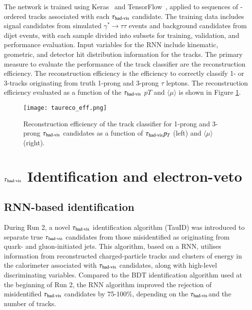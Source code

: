         The network is trained using Keras~\cite{chollet2015keras} and TensorFlow~\cite{tensorflow2015-whitepaper}, 
        applied to sequences of \pt-ordered tracks associated with 
        each $\tau_{\text{had-vis}}$ candidate. The training data includes signal candidates from simulated \(\gamma^* \rightarrow \tau\tau\) 
        events and background candidates from dijet events, with each sample divided into subsets for training, validation, and performance evaluation. 
        Input variables for the RNN include kinematic, geometric, and detector hit distribution information for the tracks. 
        The primary measure to evaluate the performance of the track classifier are the reconstruction efficiency.
        The reconstruction efficiency is the efficiency to correctly classify 1- or 3-tracks originating from truth 1-prong and 3-prong \(\tau\) leptons.
        The reconstruction efficiency evaluated as a function of the $\tau_{\text{had-vis}}$ $pT$ and $\langle \mu \rangle$ is shown in Figure \ref{fig:track_classification_eff}.
        \begin{figure}[htbp]
            \centering
            \texttt{[image: taureco\_eff.png]}
            \caption{
                Reconstruction efficiency of the track classifier for 1-prong and 3-prong $\tau_{\text{had-vis}}$ candidates as a function of $\tau_{\text{had-vis}} p_T$ (left) and $\langle \mu \rangle$ (right).
            }
            \label{fig:track_classification_eff}
        \end{figure}
\section{$\tau_{\text{had-vis}}$ Identification and electron-veto}
    \subsection{RNN-based identification}
        During Run 2, a novel $\tau_{\text{had-vis}}$ identification algorithm (TauID)
        was introduced to separate true $\tau_{\text{had-vis}}$ candidates 
        from those misidentified as originating from quark- and gluon-initiated 
        jets. This algorithm, based on a RNN, utilises information from reconstructed 
        charged-particle tracks and clusters of energy in the calorimeter associated 
        with $\tau_{\text{had-vis}}$ candidates, along with high-level discriminating 
        variables. Compared to the BDT identification algorithm used at the 
        beginning of Run 2, the RNN algorithm improved the rejection of 
        misidentified $\tau_{\text{had-vis}}$ candidates by 75-100\%, 
        depending on the $\tau_{\text{had-vis}}$\pt and the number of tracks.

